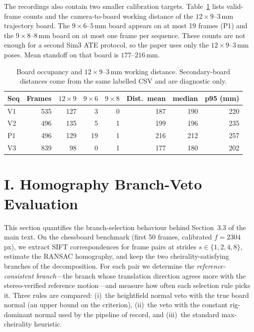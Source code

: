 \documentclass[review]{elsarticle}
\begin{document}
The recordings also contain two smaller calibration targets. Table~\ref{tab:supp_n2_boards} lists valid-frame counts and the camera-to-board working distance of the $12{\times}9$--$3$\,mm trajectory board. The $9{\times}6$--$5$\,mm board appears on at most 19 frames (P1) and the $9{\times}8$--$8$\,mm board on at most one frame per sequence. These counts are not enough for a second Sim3 ATE protocol, so the paper uses only the $12{\times}9$--$3$\,mm poses. Mean standoff on that board is $177$--$216$\,mm.

\begin{table}[h]
\centering
\caption{Board occupancy and $12{\times}9$--$3$\,mm working distance. Secondary-board distances come from the same labelled CSV and are diagnostic only.}
\label{tab:supp_n2_boards}
\setlength{\tabcolsep}{3.5pt}
\renewcommand{\arraystretch}{1.05}
\footnotesize
\begin{tabular}{l rrrr rrr}
\toprule
Seq & Frames & $12{\times}9$ & $9{\times}6$ & $9{\times}8$ & Dist.\ mean & median & p95 (mm) \\
\midrule
V1 & 535 & 127 & 3 & 0 & 187 & 190 & 220 \\
V2 & 496 & 135 & 5 & 1 & 199 & 196 & 235 \\
P1 & 496 & 129 & 19 & 1 & 216 & 212 & 257 \\
V3 & 839 & 98 & 0 & 1 & 177 & 180 & 202 \\
\bottomrule
\end{tabular}
\end{table}


\section*{I. Homography Branch-Veto Evaluation}

This section quantifies the branch-selection behaviour behind Section~3.3 of the main text. On the chessboard benchmark (first 50 frames, calibrated $f{=}2304$\,px), we extract SIFT correspondences for frame pairs at strides $s\in\{1,2,4,8\}$, estimate the RANSAC homography, and keep the two cheirality-satisfying branches of the decomposition. For each pair we determine the \emph{reference-consistent branch}---the branch whose translation direction agrees more with the stereo-verified reference motion---and measure how often each selection rule picks it. Three rules are compared: (i)~the heightfield normal veto with the true board normal (an upper bound on the criterion), (ii)~the veto with the constant rig-dominant normal used by the pipeline of record, and (iii)~the standard max-cheirality heuristic.
\end{document}
